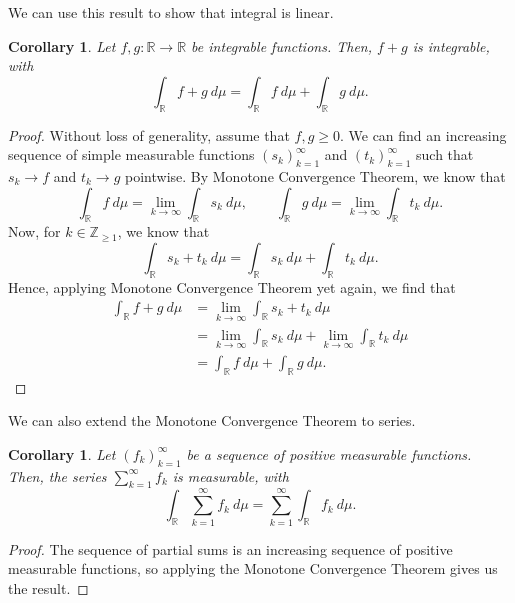 \documentclass[a4paper, openany]{memoir}
\theoremstyle{definition}
\theoremstyle{plain}
\newtheorem{corollary}[definition]{Corollary}
\begin{document}
    \noindent We can use this result to show that integral is linear.
    \begin{corollary}
        Let $f, g \colon \mathbb{R} \to \mathbb{R}$ be integrable functions. Then, $f + g$ is integrable, with
        \[\int_{\mathbb{R}} f + g \ d\mu = \int_{\mathbb{R}} f \ d\mu + \int_{\mathbb{R}} g \ d\mu.\]
    \end{corollary}
    \begin{proof}
        Without loss of generality, assume that $f, g \geq 0$. We can find an increasing sequence of simple measurable functions $(s_k)_{k=1}^\infty$ and $(t_k)_{k=1}^\infty$ such that $s_k \to f$ and $t_k \to g$ pointwise. By Monotone Convergence Theorem, we know that
        \[\int_{\mathbb{R}} f \ d\mu = \lim_{k \to \infty} \int_{\mathbb{R}} s_k \ d\mu, \qquad \int_{\mathbb{R}} g \ d\mu = \lim_{k \to \infty} \int_{\mathbb{R}} t_k \ d\mu.\]
        Now, for $k \in \mathbb{Z}_{\geq 1}$, we know that
        \[\int_{\mathbb{R}} s_k + t_k \ d\mu = \int_{\mathbb{R}} s_k \ d\mu + \int_{\mathbb{R}} t_k \ d\mu.\]
        Hence, applying Monotone Convergence Theorem yet again, we find that
        \begin{align*}
            \int_{\mathbb{R}} f + g \ d\mu &= \lim_{k \to \infty} \int_{\mathbb{R}} s_k + t_k \ d\mu \\
            &= \lim_{k \to \infty} \int_{\mathbb{R}} s_k \ d\mu + \lim_{k \to \infty} \int_{\mathbb{R}} t_k \ d\mu \\
            &= \int_{\mathbb{R}} f \ d\mu + \int_{\mathbb{R}} g \ d\mu.
        \end{align*}
    \end{proof}
    \noindent We can also extend the Monotone Convergence Theorem to series.
    \begin{corollary}
        Let $(f_k)_{k=1}^\infty$ be a sequence of positive measurable functions. Then, the series $\sum_{k=1}^{\infty} f_k$ is measurable, with
        \[\int_{\mathbb{R}} \sum_{k=1}^{\infty} f_k \ d\mu = \sum_{k=1}^{\infty} \int_{\mathbb{R}} f_k \ d\mu.\]
    \end{corollary}
    \begin{proof}
        The sequence of partial sums is an increasing sequence of positive measurable functions, so applying the Monotone Convergence Theorem gives us the result.
    \end{proof}
\end{document}

